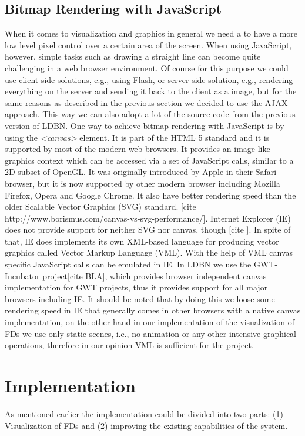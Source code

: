 \subsection{Bitmap Rendering with JavaScript}
When it comes to visualization and graphics in general we need a 
to have a more low level pixel control over a certain area of the screen. 
When using JavaScript, however, simple tasks such as drawing a straight
line can become quite challenging in a web browser environment.
Of course for this purpose we could use client-side solutions, e.g., using Flash, or 
server-side solution, e.g., rendering everything on the server and sending it back
to the client as a image, but for the same reasons as described in the previous
section we decided to use the AJAX approach. This way we can also
adopt a lot of the source code from the previous version of LDBN. 
One way to achieve bitmap rendering with JavaScript is by
using the \emph{<canvas>} element. 
It is part of the HTML 5 standard and it is supported by
most of the modern web browsers. It provides an image-like 
graphics context which can be accessed via a set of JavaScript calls, 
similar to a 2D subset of OpenGL. 
It was originally introduced by Apple in their Safari browser, but it is now 
supported by other modern browser including Mozilla Firefox, Opera and Google Chrome.
It also have  better rendering speed than the older Scalable Vector Graphics (SVG) standard.
[cite http://www.borismus.com/canvas-vs-svg-performance/]. Internet Explorer (IE) does not 
provide support for 
neither SVG nor canvas, though [cite ]. In spite of that, IE does 
implements its own XML-based language for producing vector graphics 
called Vector Markup Language (VML). With the help of VML canvas specific JavaScript 
calls can be emulated in IE. In LDBN we use the GWT-Incubator project[cite BLA], which provides
browser independent canvas implementation for GWT projects, thus 
it provides support for all major browsers including IE. It should be noted that by doing this
we loose some rendering speed in IE that generally comes in other browsers with a 
native canvas implementation, on the other hand in our implementation of the 
visualization of FDs we use only static scenes, i.e., no animation or any other intensive 
graphical operations, therefore in our opinion VML is sufficient for the project. 

\section{Implementation}
As mentioned earlier the implementation could be divided into two parts: 
(1) Visualization of FDs and 
(2) improving the existing capabilities of the system.

